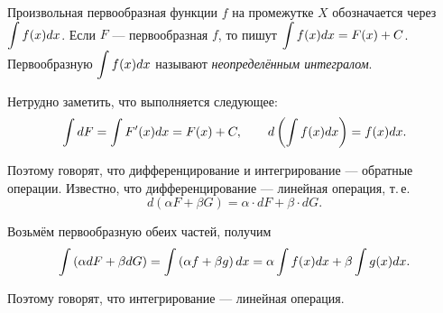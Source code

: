 Произвольная первообразная функции $f$ на промежутке $X$ обозначается через $\displaystyle\int f(x) dx$. Если $F$ --- первообразная $f$, то пишут $\displaystyle\int f(x)dx = F(x) + C$. Первообразную $\displaystyle\int f(x)dx$ называют \textit{неопределённым интегралом}.

Нетрудно заметить, что выполняется следующее:
\[
    \int dF = \int F^\prime(x)dx = F(x) + C,\qquad d\left(\int f(x)dx\right) = f(x)dx.
\]

Поэтому говорят, что дифференцирование и интегрирование --- обратные операции. Известно, что дифференцирование --- линейная операция, т.\,е.
\[
    d(\alpha F + \beta G) = \alpha \cdot dF + \beta \cdot dG.
\]

Возьмём первообразную обеих частей, получим
\[
    \int\left(\alpha dF + \beta dG\right) = \int\left(\alpha f + \beta g\right)dx = \alpha\int f(x)dx + \beta\int g(x)dx.
\]

Поэтому говорят, что интегрирование --- линейная операция.

